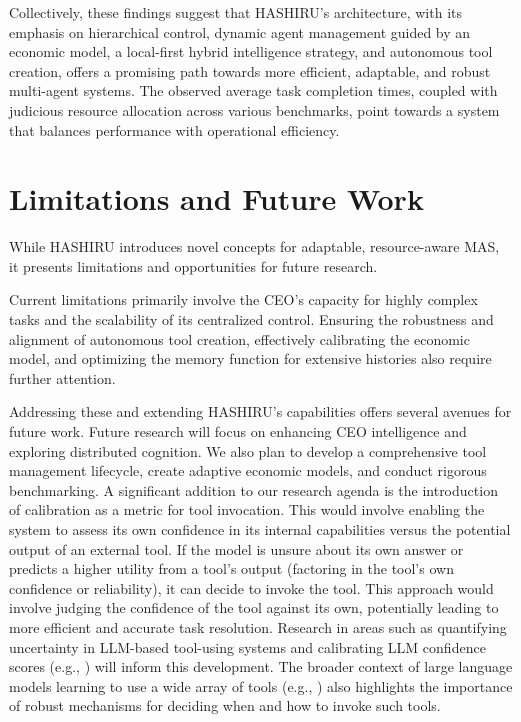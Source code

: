 \documentclass[conference]{IEEEtran}
\begin{document}
Collectively, these findings suggest that HASHIRU's architecture, with its emphasis on hierarchical control, dynamic agent management guided by an economic model, a local-first hybrid intelligence strategy, and autonomous tool creation, offers a promising path towards more efficient, adaptable, and robust multi-agent systems. The observed average task completion times, coupled with judicious resource allocation across various benchmarks, point towards a system that balances performance with operational efficiency.

\section{Limitations and Future Work}
\label{sec:limitations_future_work}

While HASHIRU introduces novel concepts for adaptable, resource-aware MAS, it presents limitations and opportunities for future research.

Current limitations primarily involve the CEO's capacity for highly complex tasks and the scalability of its centralized control. Ensuring the robustness and alignment of autonomous tool creation, effectively calibrating the economic model, and optimizing the memory function for extensive histories also require further attention.

Addressing these and extending HASHIRU's capabilities offers several avenues for future work. Future research will focus on enhancing CEO intelligence and exploring distributed cognition. We also plan to develop a comprehensive tool management lifecycle, create adaptive economic models, and conduct rigorous benchmarking. A significant addition to our research agenda is the introduction of calibration as a metric for tool invocation. This would involve enabling the system to assess its own confidence in its internal capabilities versus the potential output of an external tool. If the model is unsure about its own answer or predicts a higher utility from a tool's output (factoring in the tool's own confidence or reliability), it can decide to invoke the tool. This approach would involve judging the confidence of the tool against its own, potentially leading to more efficient and accurate task resolution. Research in areas such as quantifying uncertainty in LLM-based tool-using systems and calibrating LLM confidence scores (e.g., \cite{manggalaqa, spiess2024calibration}) will inform this development. The broader context of large language models learning to use a wide array of tools (e.g., \cite{Qin2023ToolLLM}) also highlights the importance of robust mechanisms for deciding when and how to invoke such tools.
\end{document}
